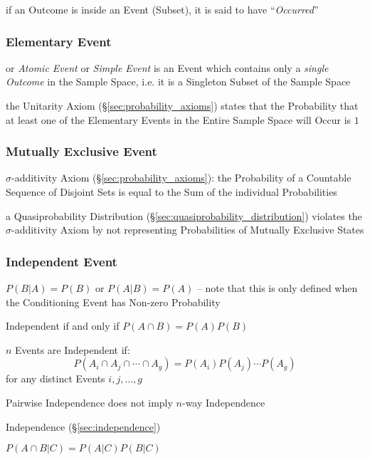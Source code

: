 if an Outcome is inside an Event (Subset), it is said to have
``\emph{Occurred}''



\subsubsection{Elementary Event}\label{sec:elementary_event}

or \emph{Atomic Event} or \emph{Simple Event} is an Event which contains only a
\emph{single Outcome} in the Sample Space, i.e. it is a Singleton Subset of the
Sample Space

the Unitarity Axiom (\S\ref{sec:probability_axioms}) states that the
Probability that at least one of the Elementary Events in the Entire Sample
Space will Occur is $1$



\subsubsection{Mutually Exclusive Event}\label{sec:mutually_exclusive}

$\sigma$-additivity Axiom (\S\ref{sec:probability_axioms}): the Probability of
a Countable Sequence of Disjoint Sets is equal to the Sum of the individual
Probabilities

a Quasiprobability Distribution (\S\ref{sec:quasiprobability_distribution})
violates the $\sigma$-additivity Axiom by not representing Probabilities of
Mutually Exclusive States



\subsubsection{Independent Event}\label{sec:independent_event}

$P(B|A) = P(B)$ or $P(A|B) = P(A)$ -- note that this is only defined when the
Conditioning Event has Non-zero Probability

Independent if and only if $P(A \cap B) = P(A) P(B)$

$n$ Events are Independent if:
\[
  P(A_i \cap A_j \cap \cdots \cap A_g) = P(A_i)P(A_j) \cdots P(A_g)
\]
for any distinct Events $i,j,\ldots,g$

Pairwise Independence does not imply $n$-way Independence

\fist Independence (\S\ref{sec:independence})

$P(A \cap B | C) = P(A|C)P(B|C)$

